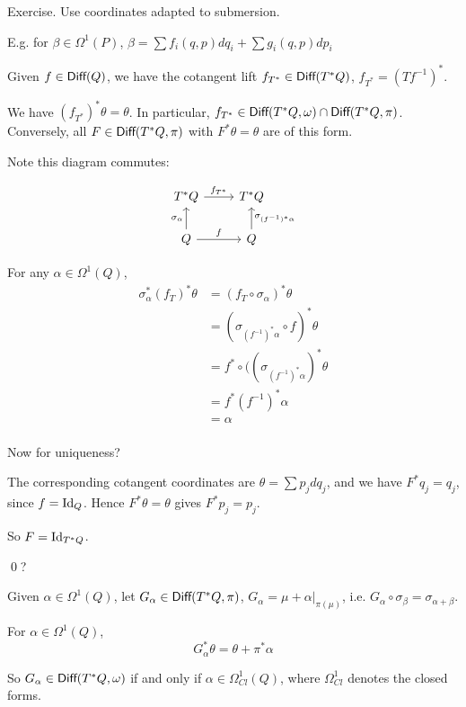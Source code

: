 \documentclass[x11names,reqno,14pt]{extarticle}
\begin{document}
\proof

Exercise. Use coordinates adapted to submersion. 

E.g. for $\beta\in\Omega^1(P)$, $\beta = \sum f_i(q, p)dq_i + \sum g_i(q, p)dp_i$

Given $f \in {{\text{\sffamily {Diff}}}}(Q)$, we have the cotangent lift $f_{T^*}\in {{\text{\sffamily {Diff}}}}(T^*Q)$, $f_{T^*} = (Tf^{-1})^*$. 

\prop

We have $(f_{T^*})^*\theta = \theta$. In particular, $f_{T^*}\in{{\text{\sffamily {Diff}}}}(T^*Q,\omega)\cap {{\text{\sffamily {Diff}}}}(T^*Q,\pi)$. Conversely, all $F \in {{\text{\sffamily {Diff}}}}(T^*Q,\pi)$ with $F^*\theta = \theta$ are of this form. 

\proof

Note this diagram commutes:

\[
\begin{tikzcd}
T^*Q\ar[r, "f_{T^*}"] & T^*Q \\
Q \ar[u, "\sigma_\alpha"]\ar[r, "f"] & Q\ar[u, "\sigma_{(f^{-1})^*\alpha}"']
\end{tikzcd}
\]

For any $\alpha\in\Omega^1(Q)$, 
\begin{align*}
\sigma_\alpha^*(f_T)^*\theta &  = (f_T\circ\sigma_\alpha)^*\theta \\
& = (\sigma_{(f^{-1})^*\alpha}\circ f)^*\theta\\
& = f^*\circ ((\sigma_{(f^{-1})^*\alpha})^*\theta\\
& = f^*(f^{-1})^*\alpha \\
& = \alpha \\
\end{align*}

Now for uniqueness?

The corresponding cotangent coordinates are $\theta = \sum p_jdq_j$, and we have $F^*q_j = q_j$, since $f = \operatorname{\mathrm{Id}}_Q$. Hence $F^*\theta = \theta$ gives $F^*p_j = p_j$. 

So $F = \operatorname{\mathrm{Id}}_{T^*Q}$.

\qed?

Given $\alpha\in\Omega^1(Q)$, let $G_\alpha \in {{\text{\sffamily {Diff}}}}(T^*Q,\pi)$, $G_\alpha = \mu + \alpha|_{\pi(\mu)}$, i.e. $G_\alpha\circ\sigma_\beta = \sigma_{\alpha + \beta}$.

\prop

For $\alpha\in\Omega^1(Q)$, 
\[
G_\alpha^*\theta = \theta + \pi^*\alpha
\]

So $G_\alpha \in {{\text{\sffamily {Diff}}}}(T^*Q,\omega)$ if and only if $\alpha\in\Omega^1_{Cl}(Q)$, where $\Omega^1_{Cl}$ denotes the closed forms. 
\end{document}
